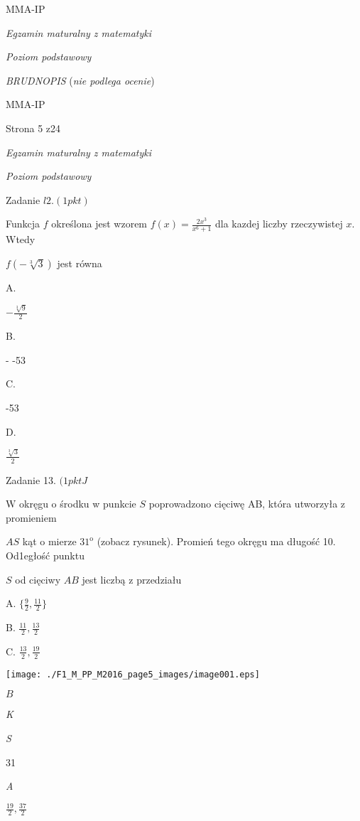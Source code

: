 \documentclass[a4paper,12pt]{article}
\begin{document}
MMA-IP





{\it Egzamin maturalny z matematyki}

{\it Poziom podstawowy}

{\it BRUDNOPIS} ({\it nie podlega ocenie})

MMA-IP

Strona 5 z24





{\it Egzamin maturalny z matematyki}

{\it Poziom podstawowy}

Zadanie $l2. (1pkt)$

Funkcja $f$ określona jest wzorem $f(x)=\displaystyle \frac{2x^{3}}{x^{6}+1}$ dla kazdej liczby rzeczywistej $x$. Wtedy

$f(-\sqrt[3]{3})$ jest równa

A.

$-\displaystyle \frac{\sqrt[3]{9}}{2}$

B.

- -53

C.

-53

D.

$\displaystyle \frac{\sqrt[3]{3}}{2}$

Zadanie 13. $(1pktJ$

$\mathrm{W}$ okręgu o środku w punkcie $S$ poprowadzono cięciwę AB, która utworzyła z promieniem

$AS$ kąt o mierze $31^{\mathrm{o}}$ (zobacz rysunek). Promień tego okręgu ma długość 10. Od1egłość punktu

$S$ od cięciwy $AB$ jest liczbą z przedziału

A. $\displaystyle \{\frac{9}{2},\frac{11}{2}\}$

B. $\displaystyle \frac{11}{2}, \displaystyle \frac{13}{2}$

C. $\displaystyle \frac{13}{2}, \displaystyle \frac{19}{2}$
\begin{center}
\texttt{[image: ./F1\_M\_PP\_M2016\_page5\_images/image001.eps]}
\end{center}
$B$

{\it K}

{\it S}

31

{\it A}

$\displaystyle \frac{19}{2}, \displaystyle \frac{37}{2}$
\end{document}
